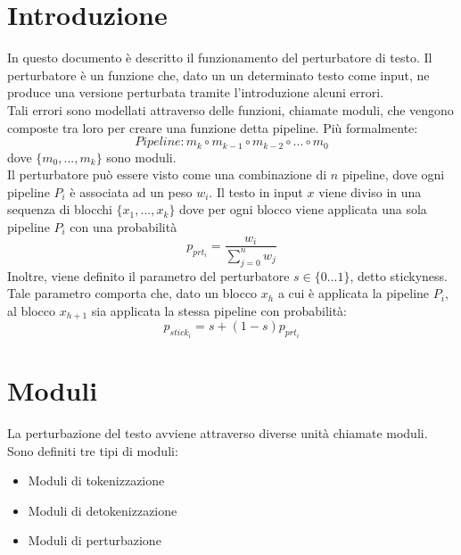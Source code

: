 \documentclass[12pt]{article}
\begin{document}
\maketitle


\section{Introduzione}
In questo documento è descritto il funzionamento del perturbatore di testo. Il perturbatore è un funzione che, dato un un determinato testo come input, ne produce una versione perturbata tramite l'introduzione alcuni errori. \\
Tali errori sono modellati attraverso delle funzioni, chiamate moduli, che vengono composte tra loro per creare una funzione detta pipeline.
Più formalmente:
\begin{equation}
\textit{Pipeline}: m_k \circ m_{k-1} \circ m_{k-2} \circ ... \circ m_0
\end{equation}
dove $\{m_0,...,m_k \}$ sono moduli.\\
Il perturbatore può essere visto come una combinazione di $n$ pipeline, dove ogni pipeline $P_i$ è associata ad un peso $w_i$. Il testo in input $x$ viene diviso in una sequenza di blocchi $\{ x_1,...,x_k \}$ dove per ogni blocco viene applicata una sola pipeline $P_i$ con una probabilità
\begin{equation}
p_{prt_i} =
\frac{w_i}
{{\sum_{j=0}^{n}}w_j}
\end{equation}
Inoltre, viene definito il parametro del perturbatore $s \in \{0...1\}$, detto stickyness. Tale parametro comporta che, dato un blocco $x_h$ a cui è applicata la pipeline $P_i$, al blocco $x_{h+1}$ sia applicata la stessa pipeline con probabilità:
\begin{equation}
p_{stick_i} =
s + (1-s)  p_{prt_i}
\end{equation}


\section{Moduli}
La perturbazione del testo avviene attraverso diverse unità chiamate moduli. Sono definiti tre tipi di moduli:
\begin{itemize}
	\item Moduli di tokenizzazione
	\item Moduli di detokenizzazione
	\item Moduli di perturbazione
\end{itemize}
\end{document}
